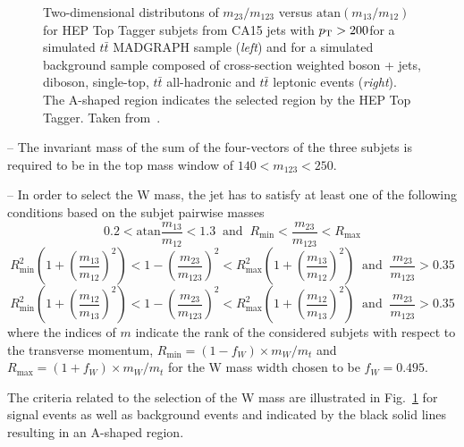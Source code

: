 \begin{description}
\begin{figure}[!tp]
\begin{tabular}{cc}
  \end{tabular}
  \caption{Two-dimensional distributons of $m_{\mathrm{23}}/m_{\mathrm{123}}$ versus $\mathrm{atan}(m_{\mathrm{13}}/m_{\mathrm{12}})$ for HEP Top Tagger subjets from CA15 jets with $p_{\text{T}} > 200$\gev for a simulated $t\bar{t}$ MADGRAPH sample (\textit{left}) and for a simulated background sample composed of cross-section weighted boson + jets, diboson, single-top, $t\bar{t}$ all-hadronic and $t\bar{t}$ leptonic events (\textit{right}). The A-shaped region indicates the selected region by the HEP Top Tagger. Taken from~\cite{CMS:2014fya}.}
  \label{fig:boosted_top_hep_variables}
\end{figure}
\begin{description}
 \item -- The invariant mass of the sum of the four-vectors of the three subjets is required to be in the top mass window of $140 < m_{\mathrm{123}} < 250$\gev.
 \item -- In order to select the W mass, the jet has to satisfy at least one of the following conditions based on the subjet pairwise masses
 \begin{equation}
0.2 < \mathrm{atan} \frac{m_{\mathrm{13}}}{m_{\mathrm{12}}} < 1.3 \; \; \mathrm{and} \; \; R_{\mathrm{min}} < \frac{m_{\mathrm{23}}}{m_{\mathrm{123}}} < R_{\mathrm{max}} 
\label{eq:hep_1}
 \end{equation}
 \begin{equation}
 R^2_{\mathrm{min}} \left( 1+ \left(\frac{m_{\mathrm{13}}}{m_{\mathrm{12}}}\right)^2 \right)  < 1 - \left( \frac{m_{\mathrm{23}}}{m_{\mathrm{123}}} \right)^2  < R^2_{\mathrm{max}} \left( 1+\left(\frac{m_{\mathrm{13}}}{m_{\mathrm{12}}} \right)^2 \right) \; \; \mathrm{and} \; \; \frac{m_{\mathrm{23}}}{m_{\mathrm{123}}} > 0.35 
\label{eq:hep_2}
\end{equation}
\begin{equation}
 R^2_{\mathrm{min}} \left( 1+ \left(\frac{m_{\mathrm{12}}}{m_{\mathrm{13}}} \right)^2 \right)  < 1 - \left(\frac{m_{\mathrm{23}}}{m_{\mathrm{123}}}\right)^2 < R^2_{\mathrm{max}}\left(1+ \left(\frac{m_{\mathrm{12}}}{m_{\mathrm{13}}} \right)^2 \right) \; \; \mathrm{and} \; \; \frac{m_{\mathrm{23}}}{m_{\mathrm{123}}} > 0.35 
\label{eq:hep_3}
\end{equation}
where the indices of $m$ indicate the rank of the considered subjets with respect to the transverse momentum, $R_{\mathrm{min}} = (1 - f_{W}) \times m_W/m_t$ and $R_{\mathrm{max}} = (1 + f_{W}) \times m_W/m_t$ for the W mass width chosen to be $f_W = 0.495$.  
\end{description}
The criteria related to the selection of the W mass are illustrated in Fig.~\ref{fig:boosted_top_hep_variables} for signal events as well as background events and indicated by the black solid lines resulting in an A-shaped region.
\end{description}
